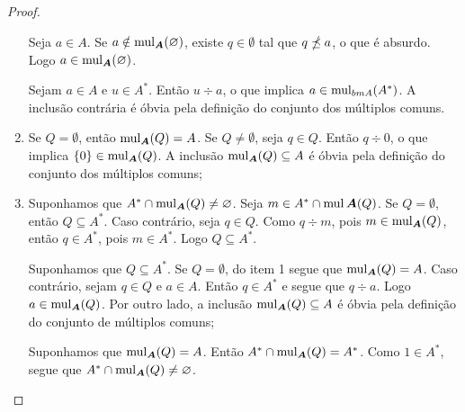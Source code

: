 \begin{proof}
\begin{enumerate}
	Seja $a \in A$. Se $a \notin \operatorname{mul}_{\bm A}(\varnothing)$, existe $q \in \emptyset$ tal que $q \npreceq a$, o que é absurdo. Logo $a \in \operatorname{mul}_{\bm A}(\varnothing)$.

	Sejam $a \in A$ e $u \in A^*$. Então $u \div a$, o que implica $a \in \operatorname{mul}_{\\bm A}(A^*)$. A inclusão contrária é óbvia pela definição do conjunto dos múltiplos comuns.

	\item Se $Q = \emptyset$, então $\operatorname{mul}_{\bm A}(Q) = A$. Se $Q \neq \emptyset$, seja $q \in Q$. Então $q \div 0$, o que implica $\{0\} \in \operatorname{mul}_{\bm A}(Q)$. A inclusão $\operatorname{mul}_{\bm A}(Q) \subseteq A$ é óbvia pela definição do conjunto dos múltiplos comuns;

	\item Suponhamos que $A^* \cap \operatorname{mul}_{\bm A}(Q) \neq \varnothing$. Seja $m \in A^* \cap \operatorname{mul}{\bm A}(Q)$. Se $Q = \emptyset$, então $Q \subseteq A^*$. Caso contrário, seja $q \in Q$. Como $q \div m$, pois $m \in \operatorname{mul}_{\bm A}(Q)$, então $q \in A^*$, pois $m \in A^*$. Logo $Q \subseteq A^*$.

	Suponhamos que $Q \subseteq A^*$. Se $Q = \emptyset$, do item 1 segue que $\operatorname{mul}_{\bm A}(Q)=A$. Caso contrário, sejam $q \in Q$ e $a \in A$. Então $q \in A^*$ e segue que $q \div a$. Logo $a \in \operatorname{mul}_{\bm A}(Q)$. Por outro lado, a  inclusão $\operatorname{mul}_{\bm A}(Q) \subseteq A$ é óbvia pela definição do conjunto de múltiplos comuns;

	Suponhamos que $\operatorname{mul}_{\bm A}(Q) = A$. Então $A^* \cap \operatorname{mul}_{\bm A}(Q) = A^*$. Como $1 \in A^*$, segue que $A^* \cap \operatorname{mul}_{\bm A}(Q) \neq \varnothing$.
	\end{enumerate}
\end{proof}



